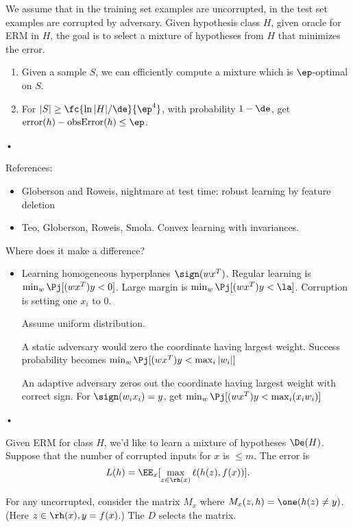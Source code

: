 We assume that in the training set examples are uncorrupted, in the test set examples are corrupted by adversary. Given hypothesis class $H$, given oracle for ERM in $H$, the goal is to select a mixture of hypotheses from $H$ that minimizes the error.

\begin{thm}
\begin{enumerate}
\item
Given a sample $S$, we can  efficiently compute a mixture which is $\ep$-optimal on $S$.
\item
For $|S|\ge \fc{\ln |H|/\de}{\ep^4}$, with probability $1-\de$, get $\text{error}(h) - \text{obsError}(h)\le \ep$.
\end{enumerate}•
\end{thm}
References:
\begin{itemize}
\item
Globerson and Roweis, nightmare at test time: robust learning by feature deletion
\item
Teo, Globerson, Roweis, Smola. Convex learning with invariances.
\end{itemize}

Where does it make a difference?
\begin{itemize}
\item
 Learning homogeneous hyperplanes $\sign(wx^T)$. Regular learning is $\min_w \Pj[(wx^T)y<0]$. Large margin is $\min_w\Pj[(wx^T)y<\la]$. Corruption is setting one $x_i$ to 0.
 
Assume uniform distribution.

A static adversary would zero the coordinate having largest weight. Success probability becomes $\min_w \Pj[(wx^T)y<\max_i|w_i|]$

An adaptive adversary %
 zeros out the coordinate having largest weight with correct sign. For $\sign(w_ix_i)=y$, get $\min_w\Pj[(wx^T)y <\max_i (x_iw_i)]$
\end{itemize}•

Given ERM for class $H$, we'd like to learn a mixture of hypotheses $\De(H)$. 
Suppose that the number of corrupted inputs for $x$ is $\le m$.
The error is
$$
L(h) = \EE_x [\max_{z\in \rh(x)} \ell(h(z),f(x))].
$$

For any uncorrupted, consider the matrix $M_x$ where $M_x(z,h) = \one(h(z)\ne y)$. (Here $z\in \rh(x), y=f(x)$.) The $D$ selects the matrix.

